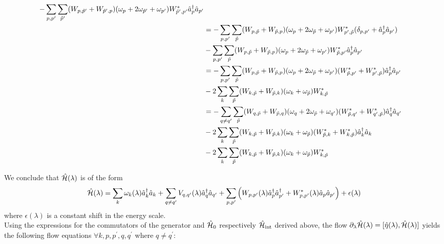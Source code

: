 \begin{appendix}
\begin{itemize}
\begin{align}
-\sum\limits_{p,p^\prime}\sum\limits_{\tilde p^\prime}(W_{p,\tilde p^\prime}+W_{\tilde p^\prime,p})(\omega_p+2\omega_{\tilde p^\prime}+\omega_{ p^\prime})W_{\tilde p^\prime, p^\prime}^*\hat a^\dagger_p\hat a_{ p^\prime}\nonumber \\ \quad& 
=-\sum\limits_{p,p^\prime}\sum\limits_{\tilde p}(W_{p,\tilde p}+W_{\tilde p,p})(\omega_p+2\omega_{\tilde p}+\omega_{p^\prime})W_{p^\prime,\tilde p}^*(\delta_{p,p^\prime}+\hat a^\dagger_p\nonumber\hat a_{p^\prime}) \\ \quad& 
-\sum\limits_{p,p^\prime}\sum\limits_{\tilde p}(W_{p,\tilde p}+W_{\tilde p,p})(\omega_p+2\omega_{\tilde p}+\omega_{ p^\prime})W_{\tilde p, p^\prime}^*\hat a^\dagger_p\hat a_{ p^\prime}\nonumber \\ \quad& 
= -\sum\limits_{p,p^\prime}\sum\limits_{\tilde p}(W_{p,\tilde p}+W_{\tilde p,p})(\omega_p+2\omega_{\tilde p}+\omega_{ p^\prime})(W_{\tilde p, p^\prime}^*+W_{p^\prime,\tilde p}^*)\hat a^\dagger_p\hat a_{ p^\prime}\nonumber \\ \quad& 
-2\sum\limits_{k}\sum\limits_{\tilde p}(W_{k,\tilde p}+W_{\tilde p,k})(\omega_k+\omega_{\tilde p})W_{k,\tilde p}^*\nonumber \\ \quad& 
= -\sum\limits_{q\neq q^\prime}\sum\limits_{\tilde p}(W_{q,\tilde p}+W_{\tilde p,q})(\omega_q+2\omega_{\tilde p}+\omega_{ q^\prime})(W_{\tilde p, q^\prime}^*+W_{q^\prime,\tilde p}^*)\hat a^\dagger_q\hat a_{ q^\prime}\nonumber \\ \quad& 
-2\sum\limits_{k}\sum\limits_{\tilde p}(W_{k,\tilde p}+W_{\tilde p,k})(\omega_k+\omega_{\tilde p})(W_{\tilde p, k}^*+W_{k,\tilde p}^*)\hat a^\dagger_k\hat a_{ k}\nonumber \\ \quad& 
-2\sum\limits_{k}\sum\limits_{\tilde p}(W_{k,\tilde p}+W_{\tilde p,k})(\omega_k+\omega_{\tilde p})W_{k,\tilde p}^*
\end{align}
\end{itemize}
We conclude that $\hat{\mathcal{H}}(\lambda)$ is of the form 
\begin{align}
\hat{\mathcal{H}}(\lambda)=\sum\limits_k \omega_k(\lambda) \hat a^\dagger_k\hat a_k+\sum\limits_{q\neq q^\prime}V_{q,q^\prime}(\lambda)\hat a^\dagger_q\hat a_{q^\prime}+\sum\limits_{p,p^\prime}\left(W_{p,p^\prime}(\lambda)\hat a^\dagger_p\hat a^\dagger_{p^\prime}+W_{p,p^\prime}^*(\lambda)\hat a_p\hat a_{p^\prime}\right)+\epsilon(\lambda)
\end{align}
where $\epsilon(\lambda)$ is a constant shift in the energy scale.\\
Using the expressions for the commutators of the generator and $\hat{\mathcal{H}}_0$ respectively $\hat{\mathcal{H}}_{\mathrm{int}}$ derived above, the flow $\partial_\lambda\hat{\mathcal{H}}(\lambda)=[\hat\eta(\lambda),\hat{\mathcal{H}}(\lambda)]$ yields the following flow equations $\forall k, p,p^\prime, q, q^\prime$ where $q\neq q^\prime$:
\begin{flushleft}

\end{flushleft}
\end{appendix}
